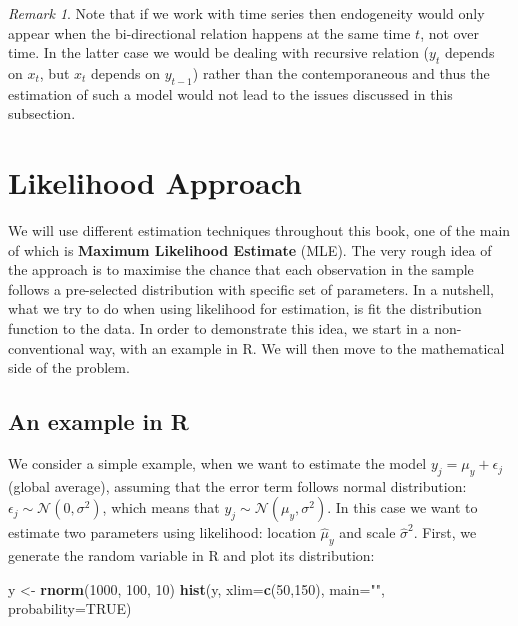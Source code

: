 \documentclass[
]{book}
\newenvironment{Shaded}{\begin{snugshade}}{\end{snugshade}}
\newcommand{\AttributeTok}[1]{\textcolor[rgb]{0.13,0.29,0.53}{#1}}
\newcommand{\ConstantTok}[1]{\textcolor[rgb]{0.56,0.35,0.01}{#1}}
\newcommand{\DecValTok}[1]{\textcolor[rgb]{0.00,0.00,0.81}{#1}}
\newcommand{\FunctionTok}[1]{\textcolor[rgb]{0.13,0.29,0.53}{\textbf{#1}}}
\newcommand{\NormalTok}[1]{#1}
\newcommand{\OtherTok}[1]{\textcolor[rgb]{0.56,0.35,0.01}{#1}}
\newcommand{\StringTok}[1]{\textcolor[rgb]{0.31,0.60,0.02}{#1}}
\theoremstyle{definition}
\theoremstyle{definition}
\theoremstyle{definition}
\theoremstyle{definition}
\theoremstyle{remark}
\newtheorem*{remark}{Remark}
\begin{document}
\begin{remark}
Note that if we work with time series then endogeneity would only appear when the bi-directional relation happens at the same time \(t\), not over time. In the latter case we would be dealing with recursive relation (\(y_t\) depends on \(x_{t}\), but \(x_t\) depends on \(y_{t-1}\)) rather than the contemporaneous and thus the estimation of such a model would not lead to the issues discussed in this subsection.
\end{remark}

\chapter{Likelihood Approach}\label{likelihoodApproach}

We will use different estimation techniques throughout this book, one of the main of which is \textbf{Maximum Likelihood Estimate} (MLE). The very rough idea of the approach is to maximise the chance that each observation in the sample follows a pre-selected distribution with specific set of parameters. In a nutshell, what we try to do when using likelihood for estimation, is fit the distribution function to the data. In order to demonstrate this idea, we start in a non-conventional way, with an example in R. We will then move to the mathematical side of the problem.

\section{An example in R}\label{likelihoodInR}

We consider a simple example, when we want to estimate the model \(y_j = \mu_y + \epsilon_j\) (global average), assuming that the error term follows normal distribution: \(\epsilon_j \sim \mathcal{N}(0, \sigma^2)\), which means that \(y_j \sim \mathcal{N}(\mu_{y}, \sigma^2)\). In this case we want to estimate two parameters using likelihood: location \(\hat{\mu}_y\) and scale \(\hat{\sigma}^2\). First, we generate the random variable in R and plot its distribution:

\begin{Shaded}
\begin{Highlighting}[]
\NormalTok{y }\OtherTok{\textless{}{-}} \FunctionTok{rnorm}\NormalTok{(}\DecValTok{1000}\NormalTok{, }\DecValTok{100}\NormalTok{, }\DecValTok{10}\NormalTok{)}
\FunctionTok{hist}\NormalTok{(y, }\AttributeTok{xlim=}\FunctionTok{c}\NormalTok{(}\DecValTok{50}\NormalTok{,}\DecValTok{150}\NormalTok{), }\AttributeTok{main=}\StringTok{""}\NormalTok{, }\AttributeTok{probability=}\ConstantTok{TRUE}\NormalTok{)}
\end{Highlighting}
\end{Shaded}
\end{document}
